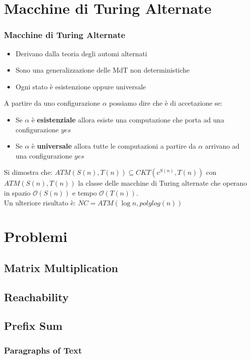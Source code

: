 \documentclass{beamer}
\newcommand{\bigO}{\ensuremath{\mathcal{O}}} %
\begin{document}
\section{Macchine di Turing Alternate}
\begin{frame}
	\frametitle{Macchine di Turing Alternate} %
	\begin{itemize}
		\item Derivano dalla teoria degli automi alternati
		\item Sono una generalizzazione delle MdT non deterministiche
		\item Ogni stato è esistenzione oppure universale
	\end{itemize}
	A partire da uno configurazione $\alpha$ possiamo dire che è di accetazione se:
	\begin{itemize}
		\item Se $\alpha$ è \textbf{esistenziale} allora esiste una computazione che porta ad una configurazione $yes$
		\item Se $\alpha$ è \textbf{universale} allora tutte le computazioni a partire da $\alpha$ arrivano ad una configurazione $yes$
	\end{itemize}
	Si dimostra che: $ATM(S(n),T(n)) \subseteq CKT(c^{S(n)},T(n))$ con $ATM(S(n),T(n))$ la classe delle macchine di Turing alternate che operano in spazio $\bigO{(S(n))}$ e tempo $\bigO{(T(n))}$.\\
	Un ulteriore risultato è: $NC = ATM(\log n,polylog(n))$

	
\end{frame}

\section{Problemi}
\subsection{Matrix Multiplication}
\subsection{Reachability}
\subsection{Prefix Sum}

\begin{frame}
\frametitle{Paragraphs of Text}
\end{frame}
\end{document}
